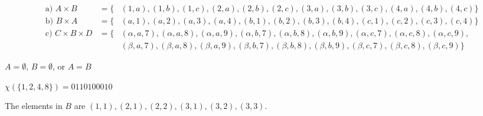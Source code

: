 \begin{Solution}{6.6}
\quad
 \begin{align*}
       & \text{a) } A \times B &= \{&(1,a),(1,b),(1,c), (2,a),(2,b),(2,c), (3,a),(3,b),(3,c), (4,a),(4,b),(4,c)  \} \\
        &\text{b) } B \times A &= \{&(a,1),(a,2),(a,3),(a,4),  (b,1),(b,2),(b,3),(b,4),  (c,1),(c,2),(c,3),(c,4)  \} \\
        &\text{c) } C \times B \times D &=
                                 \{&(\alpha,a,7),(\alpha,a,8),(\alpha,a,9), (\alpha,b,7),(\alpha,b,8),(\alpha,b,9),(\alpha,c,7),(\alpha,c,8),(\alpha,c,9),\\
                                   &&&(\beta,a,7),(\beta,a,8),(\beta,a,9), (\beta,b,7),(\beta,b,8),(\beta,b,9),(\beta,c,7),(\beta,c,8),(\beta,c,9)   \}
\end{align*}
\end{Solution}

\begin{Solution}{6.7}
\quad
$A=\emptyset$, $B=\emptyset$, or $A=B$
\end{Solution}

\begin{Solution}{6.8}
\quad
$\chi(\{1,2,4,8\})=0110100010$
\end{Solution}

\begin{Solution}{6.9}
\quad
The elements in $B$ are $(1,1), (2,1), (2,2), (3,1), (3,2), (3,3)$.
\end{Solution}
